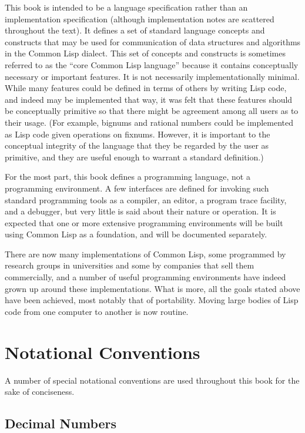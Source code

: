 This book is intended to be a language specification
rather than an implementation specification
(although implementation notes are scattered throughout the text).
It defines a set of
standard language concepts and constructs that may be used
for communication of data structures and algorithms in the Common Lisp
dialect.  This set of concepts
and constructs is sometimes referred to as the ``core Common Lisp language''
because it contains conceptually necessary or important features.
It is not necessarily implementationally minimal.
While many features could be defined in terms of others
by writing Lisp code, and indeed may be implemented that way,
it was felt that these features should be conceptually primitive
so that there might be agreement among all users as to their usage.
(For example, bignums and rational numbers could be implemented as
Lisp code given operations on fixnums.  However, it is important
to the conceptual integrity of the language that they be regarded
by the user as primitive, and they are useful enough to warrant
a standard definition.)

For the most part, this book defines a programming language, not a
programming environment.  A few interfaces are defined for
invoking such standard programming tools as a compiler, an editor,
a program trace facility, and a debugger, but very little is said
about their nature or operation.  It is expected that one or more
extensive programming environments will be built using Common Lisp as a
foundation, and will be documented separately.

\begin{newer}
There are now many implementations of Common Lisp,
some programmed by research groups in universities
and some by companies that sell them commercially,
and a number of useful
programming environments have indeed grown up around
these implementations.
What is more, all the goals stated above have been achieved,
most notably that of portability.  Moving large bodies
of Lisp code from one computer to another is now routine.
\end{newer}

\section{Notational Conventions}

A number of special notational conventions are used throughout this book
for the sake of conciseness.

\subsection{Decimal Numbers}

